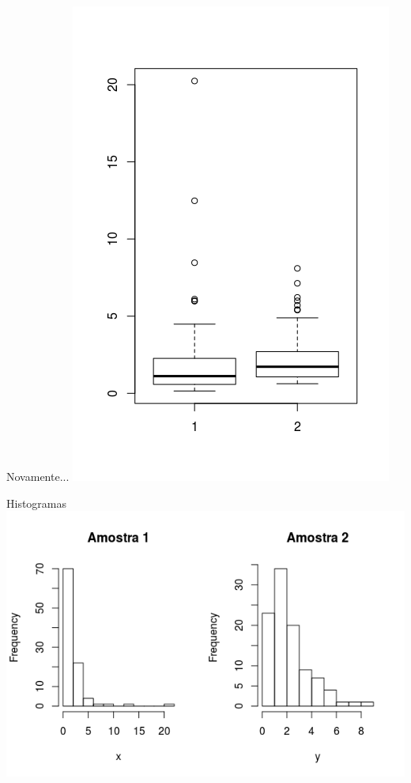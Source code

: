 \documentclass{beamer}
\begin{document}
\begin{frame}{Novamente...}
  \centering
  \includegraphics[height=\textheight]{Cap37-38/2samples-bp}
\end{frame}

\begin{frame}{Histogramas}
  \includegraphics[width=\textwidth]{Cap37-38/2samples-h}

\end{frame}
\end{document}
